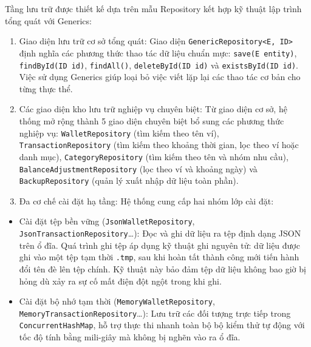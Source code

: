 \documentclass[a4paper,12pt]{report}
\providecommand{\tightlist}{%
  \setlength{\itemsep}{0pt}\setlength{\parskip}{0pt}}
\newcommand{\passthrough}[1]{#1}
\begin{document}
Tầng lưu trữ được thiết kế dựa trên mẫu Repository kết hợp kỹ thuật lập
trình tổng quát với Generics:

\begin{enumerate}
\def\labelenumi{\arabic{enumi}.}
\item
  Giao diện lưu trữ cơ sở tổng quát: Giao diện
  \passthrough{\lstinline!GenericRepository<E, ID>!} định nghĩa các
  phương thức thao tác dữ liệu chuẩn mực:
  \passthrough{\lstinline!save(E entity)!},
  \passthrough{\lstinline!findById(ID id)!},
  \passthrough{\lstinline!findAll()!},
  \passthrough{\lstinline!deleteById(ID id)!} và
  \passthrough{\lstinline!existsById(ID id)!}. Việc sử dụng Generics
  giúp loại bỏ việc viết lặp lại các thao tác cơ bản cho từng thực thể.
\item
  Các giao diện kho lưu trữ nghiệp vụ chuyên biệt: Từ giao diện cơ sở,
  hệ thống mở rộng thành 5 giao diện chuyên biệt bổ sung các phương thức
  nghiệp vụ: \passthrough{\lstinline!WalletRepository!} (tìm kiếm theo
  tên ví), \passthrough{\lstinline!TransactionRepository!} (tìm kiếm
  theo khoảng thời gian, lọc theo ví hoặc danh mục),
  \passthrough{\lstinline!CategoryRepository!} (tìm kiếm theo tên và
  nhóm nhu cầu), \passthrough{\lstinline!BalanceAdjustmentRepository!}
  (lọc theo ví và khoảng ngày) và
  \passthrough{\lstinline!BackupRepository!} (quản lý xuất nhập dữ liệu
  toàn phần).
\item
  Đa cơ chế cài đặt hạ tầng: Hệ thống cung cấp hai nhóm lớp cài đặt:
\end{enumerate}

\begin{itemize}
\tightlist
\item
  Cài đặt tệp bền vững (\passthrough{\lstinline!JsonWalletRepository!},
  \passthrough{\lstinline!JsonTransactionRepository!}\ldots): Đọc và ghi
  dữ liệu ra tệp định dạng JSON trên ổ đĩa. Quá trình ghi tệp áp dụng kỹ
  thuật ghi nguyên tử: dữ liệu được ghi vào một tệp tạm thời
  \passthrough{\lstinline!.tmp!}, sau khi hoàn tất thành công mới tiến
  hành đổi tên đè lên tệp chính. Kỹ thuật này bảo đảm tệp dữ liệu không
  bao giờ bị hỏng dù xảy ra sự cố mất điện đột ngột trong khi ghi.
\item
  Cài đặt bộ nhớ tạm thời
  (\passthrough{\lstinline!MemoryWalletRepository!},
  \passthrough{\lstinline!MemoryTransactionRepository!}\ldots): Lưu trữ
  các đối tượng trực tiếp trong
  \passthrough{\lstinline!ConcurrentHashMap!}, hỗ trợ thực thi nhanh
  toàn bộ bộ kiểm thử tự động với tốc độ tính bằng mili-giây mà không bị
  nghẽn vào ra ổ đĩa.
\end{itemize}
\end{document}
